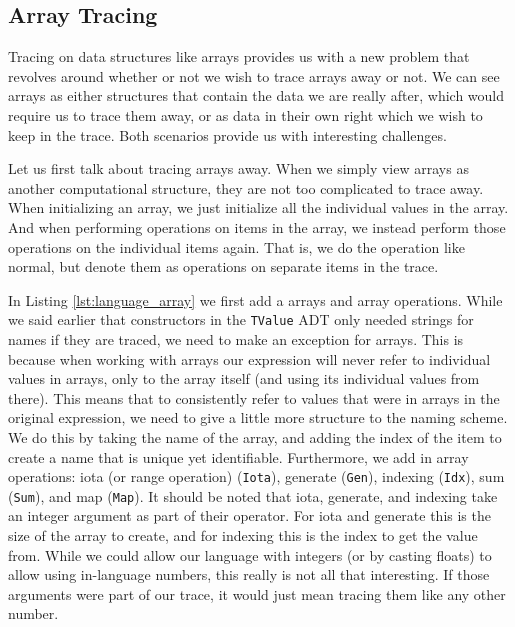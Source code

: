     \subsection{Array Tracing} \label{sec:arrays}
        Tracing on data structures like arrays provides us with a new problem that revolves around whether or not we wish to trace arrays away or not.
        We can see arrays as either structures that contain the data we are really after, which would require us to trace them away, or as data in their own right which we wish to keep in the trace.
        Both scenarios provide us with interesting challenges.
        
        Let us first talk about tracing arrays away.
        When we simply view arrays as another computational structure, they are not too complicated to trace away.
        When initializing an array, we just initialize all the individual values in the array.
        And when performing operations on items in the array, we instead perform those operations on the individual items again.
        That is, we do the operation like normal, but denote them as operations on separate items in the trace.
        
        In Listing \ref{lst:language_array} we first add a arrays and array operations.
        While we said earlier that constructors in the \texttt{TValue} ADT only needed strings for names if they are traced, we need to make an exception for arrays.
        This is because when working with arrays our expression will never refer to individual values in arrays, only to the array itself (and using its individual values from there).
        This means that to consistently refer to values that were in arrays in the original expression, we need to give a little more structure to the naming scheme.
        We do this by taking the name of the array, and adding the index of the item to create a name that is unique yet identifiable. 
        Furthermore, we add in array operations: iota (or range operation) (\texttt{Iota}), generate (\texttt{Gen}), indexing (\texttt{Idx}), sum (\texttt{Sum}), and map (\texttt{Map}).
        It should be noted that iota, generate, and indexing take an integer argument as part of their operator.
        For iota and generate this is the size of the array to create, and for indexing this is the index to get the value from.
        While we could allow our language with integers (or by casting floats) to allow using in-language numbers, this really is not all that interesting.
        If those arguments were part of our trace, it would just mean tracing them like any other number.

